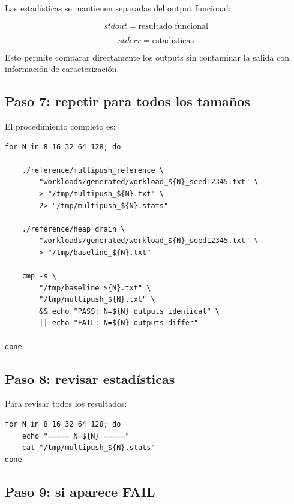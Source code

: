 \documentclass[11pt,a4paper]{article}
\begin{document}
Las estadísticas se mantienen separadas del output funcional:

\[
\boxed{
stdout=\text{resultado funcional}
}
\]

\[
\boxed{
stderr=\text{estadísticas}
}
\]

Esto permite comparar directamente los outputs sin contaminar la salida
con información de caracterización.

\subsection{Paso 7: repetir para todos los tamaños}

El procedimiento completo es:

\begin{lstlisting}[style=terminal]
for N in 8 16 32 64 128; do

    ./reference/multipush_reference \
        "workloads/generated/workload_${N}_seed12345.txt" \
        > "/tmp/multipush_${N}.txt" \
        2> "/tmp/multipush_${N}.stats"

    ./reference/heap_drain \
        "workloads/generated/workload_${N}_seed12345.txt" \
        > "/tmp/baseline_${N}.txt"

    cmp -s \
        "/tmp/baseline_${N}.txt" \
        "/tmp/multipush_${N}.txt" \
        && echo "PASS: N=${N} outputs identical" \
        || echo "FAIL: N=${N} outputs differ"

done
\end{lstlisting}

\subsection{Paso 8: revisar estadísticas}

Para revisar todos los resultados:

\begin{lstlisting}[style=terminal]
for N in 8 16 32 64 128; do
    echo "===== N=${N} ====="
    cat "/tmp/multipush_${N}.stats"
done
\end{lstlisting}

\subsection{Paso 9: si aparece FAIL}
\end{document}
